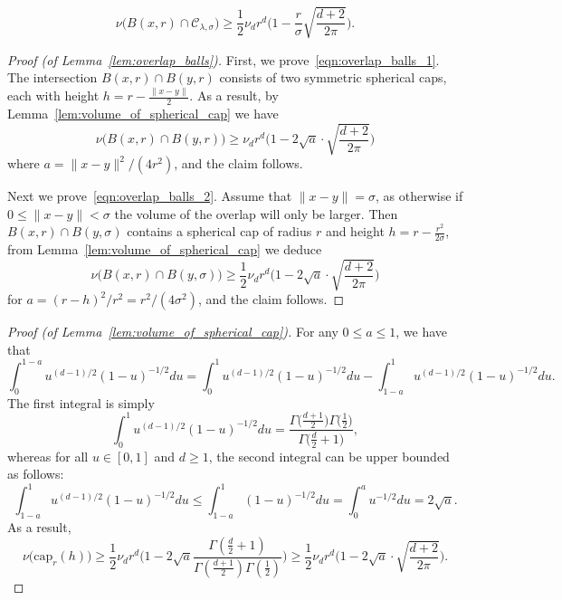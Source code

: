 \documentclass{article}
\newcommand{\1}{\mathbf{1}}
\newcommand{\mc}[1]{\mathcal{#1}}
\theoremstyle{definition}
\theoremstyle{remark}
\begin{document}
\begin{equation}
\label{eqn:uniform_local_conductance}
\nu\bigl(B(x,r) \cap \mc{C}_{\lambda,\sigma}\bigr) \geq \frac{1}{2} \nu_d r^d\biggl(1 - \frac{r}{\sigma}\sqrt{\frac{d + 2}{2\pi}}\biggr).
\end{equation}  
\begin{proof}[Proof (of Lemma~\ref{lem:overlap_balls})]
	First, we prove~\eqref{eqn:overlap_balls_1}. The intersection $B(x,r) \cap B(y,r)$ consists of two symmetric spherical caps, each with height $h = r - \frac{\|x - y\|}{2}$. 
	As a result, by Lemma~\ref{lem:volume_of_spherical_cap} we have
	\begin{equation*}
	\nu\bigl(B(x,r) \cap B(y,r)\bigr) \geq \nu_d r^d \bigl(1 - 2\sqrt{a} \cdot \sqrt{\frac{d + 2}{2\pi}}\bigr)
	\end{equation*}
	where $a = \|x - y\|^2/(4r^2)$, and the claim follows.
	
	Next we prove~\eqref{eqn:overlap_balls_2}. Assume that $\|x - y\| = \sigma$, as otherwise if $0 \leq \|x - y\| < \sigma$ the volume of the overlap will only be larger. Then $B(x,r) \cap B(y,\sigma)$ contains a spherical cap of radius $r$ and height $h = r - \frac{r^2}{2\sigma}$, from Lemma~\ref{lem:volume_of_spherical_cap} we deduce
	\begin{equation*}
	\nu\bigl(B(x,r) \cap B(y,\sigma)\bigr) \geq \frac{1}{2}\nu_dr^d\biggl(1 - 2\sqrt{a}\cdot\sqrt{\frac{d + 2}{2\pi}}\biggr)
	\end{equation*}
	for $a = (r - h)^2/r^2 = r^2/(4\sigma^2)$, and the claim follows.
\end{proof}

\begin{proof}[Proof (of Lemma~\ref{lem:volume_of_spherical_cap})]
	For any $0 \leq a \leq 1$, we have that
	\begin{equation*}
	\int_{0}^{1 - a}u^{(d-1)/2}(1 - u)^{-1/2}du = \int_{0}^{1}u^{(d-1)/2}(1 - u)^{-1/2}du - \int_{1 - a}^{1}u^{(d-1)/2}(1 - u)^{-1/2}du. 
	\end{equation*}
	The first integral is simply
	\begin{equation*}
	\int_{0}^{1}u^{(d-1)/2}(1 - u)^{-1/2}du = \frac{\Gamma\bigl(\frac{d + 1}{2}\bigr)\Gamma\bigl(\frac{1}{2}\bigr)}{ \Gamma\bigl(\frac{d}{2}+ 1\bigr)},
	\end{equation*}
	whereas for all $u \in [0,1]$ and $d \geq 1$, the second integral can be upper bounded as follows:
	\begin{equation*}
	\int_{1 - a}^{1}u^{(d-1)/2}(1 - u)^{-1/2}du \leq \int_{1 - a}^{1}(1 - u)^{-1/2}du = \int_{0}^{a} u^{-1/2}du = 2\sqrt{a}.
	\end{equation*}
	As a result, 
	\begin{equation*}
	\nu\bigl(\mathrm{cap}_r(h)\bigr) \geq \frac{1}{2}\nu_dr^d \biggl(1 - 2\sqrt{a}\frac{\Gamma(\frac{d}{2} + 1)}{\Gamma(\frac{d + 1}{2})\Gamma(\frac{1}{2})}\biggr)  \geq \frac{1}{2}\nu_dr^d \biggl(1 - 2\sqrt{a} \cdot \sqrt{\frac{d + 2}{2\pi}}\biggr).
	\end{equation*}
\end{proof}
\end{document}
